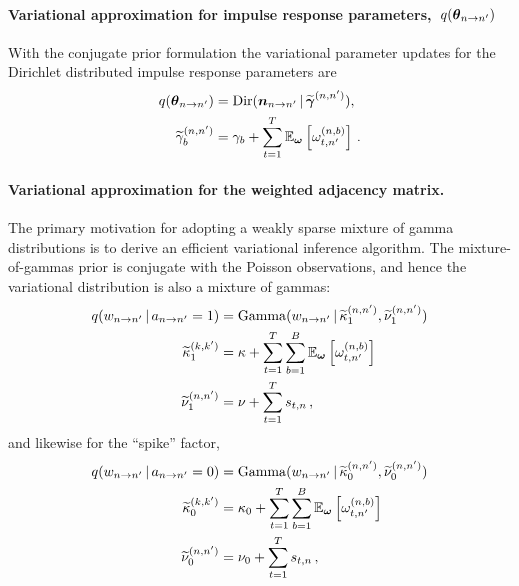 \paragraph{Variational approximation for impulse response parameters,~$q(\boldsymbol{\theta}_{n \to n'})$}
With the conjugate prior formulation the variational parameter updates
for the Dirichlet distributed impulse response parameters are
\begin{align*}
q(\boldsymbol{\theta}_{n \to n'}) &= \mathrm{Dir}(\boldsymbol{n}_{n \to n'} \,|\, \widetilde{\boldsymbol{\gamma}}^{(n,n')}), \\
\widetilde{\gamma}_b^{(n,n')} &= \gamma_{b} + \sum_{t=1}^T \mathbb{E}_{\boldsymbol{\omega}}\left[\omega_{t,n'}^{(n,b)}\right]\,.
\end{align*}

\paragraph{Variational approximation for the weighted adjacency matrix.}
The primary motivation for adopting a weakly sparse mixture of gamma
distributions is to derive an efficient variational inference
algorithm.  The mixture-of-gammas prior is conjugate with the Poisson
observations, and hence the variational distribution is also a mixture
of gammas:
\begin{align*}
  q(w_{n \to n'} \,|\, a_{n \to n'}=1)
  &= \mathrm{Gamma}(w_{n \to n'} \,|\,
  \widetilde{\kappa}^{(n,n')}_1,
  \widetilde{\nu}^{(n,n')}_1) \\
  \widetilde{\kappa}^{(k,k')}_1
  &= \kappa + \sum_{t=1}^T \sum_{b=1}^B \mathbb{E}_{\boldsymbol{\omega}}\left[\omega_{t,n'}^{(n,b)}\right] \\
  \widetilde{\nu}^{(n,n')}_1
  &= \nu + \sum_{t=1}^T s_{t,n}\,,
\end{align*}
and likewise for the ``spike'' factor,
\begin{align*}
  q(w_{n \to n'} \,|\, a_{n \to n'}=0)
  &= \mathrm{Gamma}(w_{n \to n'} \,|\,
  \widetilde{\kappa}^{(n,n')}_0,
  \widetilde{\nu}^{(n,n')}_0) \\
  \widetilde{\kappa}^{(k,k')}_0
  &= \kappa_0 + \sum_{t=1}^T \sum_{b=1}^B \mathbb{E}_{\boldsymbol{\omega}}\left[\omega_{t,n'}^{(n,b)}\right] \\
  \widetilde{\nu}^{(n,n')}_0
  &= \nu_0 + \sum_{t=1}^T s_{t,n}\,,
\end{align*}

